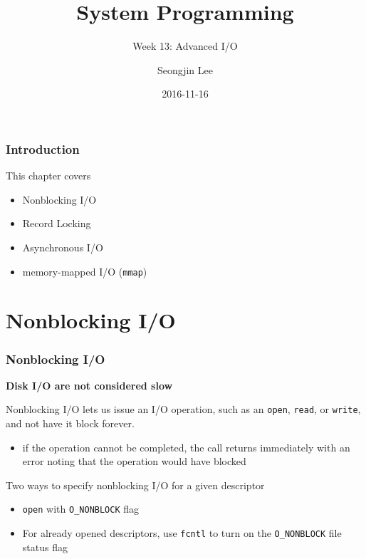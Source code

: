 \documentclass[newPxFont,sthlmFooter,nooffset]{beamer}
\title{System Programming}
\subtitle{Week 13: Advanced I/O}
\author[SJL]{Seongjin Lee}
\institute{\href{mailto:insight@hanyang.ac.kr}{insight@hanyang.ac.kr}\\\url{http://esos.hanyang.ac.kr}\\Esos Lab. Hanyang University}
\date{2016-11-16}
\begin{document}
\frame[plain]{\titlepage} 






\begin{frame}[t]
  \frametitle{Introduction}
This chapter covers
\begin{itemize}
\item Nonblocking I/O
\item Record Locking
\item Asynchronous I/O
\item memory-mapped I/O (\texttt{mmap})
\end{itemize}
\end{frame}

\section{Nonblocking I/O}

\begin{frame}[t]
  \frametitle{Nonblocking I/O}

\textbf{Disk I/O are not considered slow}
\bigskip

Nonblocking I/O lets us issue an I/O operation, such as an \texttt{open}, \texttt{read}, or \texttt{write}, and not have it block forever.
\begin{itemize}
\item if the operation cannot be completed, the call returns immediately with an error noting that the operation would have blocked
\end{itemize}

\bigskip
Two ways to specify nonblocking I/O for a given descriptor
\begin{itemize}
\item \texttt{open} with \texttt{O\_NONBLOCK} flag
\item For already opened descriptors, use \texttt{fcntl} to turn on the \texttt{O\_NONBLOCK} file status flag
\end{itemize}
\end{frame}
\end{document}
